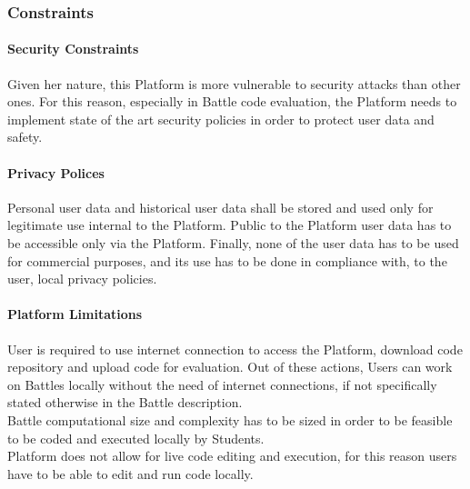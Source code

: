\subsubsection{Constraints}
\paragraph{Security Constraints}
Given her nature, this Platform is more vulnerable to security attacks than other ones. For this reason, especially in Battle code evaluation, the Platform needs to implement state of the art security policies in order to protect user data and safety.
\paragraph{Privacy Polices}
Personal user data and historical user data shall be stored and used only for legitimate use internal to the Platform. Public to the Platform user data has to be accessible only via the Platform. Finally, none of the user data has to be used for commercial purposes, and its use has to be done in compliance with, to the user, local privacy policies. 
\paragraph{Platform Limitations}
User is required to use internet connection to access the Platform, download code repository and upload code for evaluation. Out of these actions, Users can work on Battles locally without the need of internet connections, if not specifically stated otherwise in the Battle description.\\
Battle computational size and complexity has to be sized in order to be feasible to be coded and executed locally by Students.\\
Platform does not allow for live code editing and execution, for this reason users have to be able to edit and run code locally.